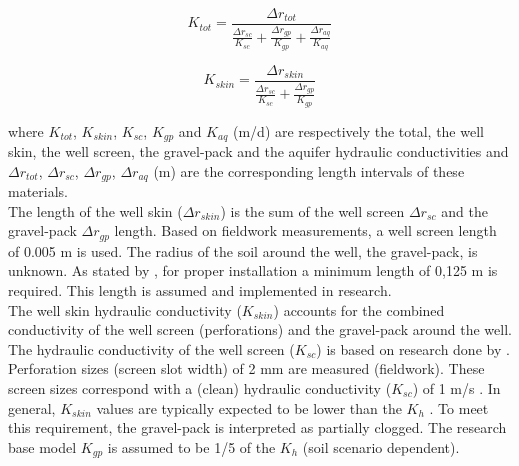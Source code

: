 \begin{equation}
 K_{tot} = \frac{\Delta r_{tot}}{\frac{\Delta r_{sc}}{K_{sc}} + \frac{\Delta r_{gp}}{K_{gp}} + \frac{\Delta r_{aq}}{K_{aq}}}
\label{eq:K_tot}
\end{equation}

\begin{equation}
 K_{skin} = \frac{\Delta r_{skin}}{\frac{\Delta r_{sc}}{K_{sc}} + \frac{\Delta r_{gp}}{K_{gp}}}
\label{eq:K_skin}
\end{equation}

where $K_{tot}$, $K_{skin}$, $K_{sc}$, $K_{gp}$ and $K_{aq}$ (m/d) are respectively the total, the well skin, the well screen, the gravel-pack and the aquifer hydraulic conductivities and ${\Delta r_{tot}}$, ${\Delta r_{sc}}$, ${\Delta r_{gp}}$, ${\Delta r_{aq}}$ (m) are the corresponding length intervals of these materials. \\

The length of the well skin ($\Delta r_{skin}$) is the sum of the well screen ${\Delta r_{sc}}$ and the gravel-pack ${\Delta r_{gp}}$ length. Based on fieldwork measurements, a well screen length of 0.005 m is used. The radius of the soil around the well, the gravel-pack, is unknown. As stated by \citep{Bot2016}, for proper installation a minimum length of 0,125 m is required. This length is assumed and implemented in research. \\

The well skin hydraulic conductivity ($K_{skin}$) accounts for the combined conductivity of the well screen (perforations) and the gravel-pack around the well. The hydraulic conductivity of the well screen ($K_{sc}$) is based on research done by \citet{Houben2015}. Perforation sizes (screen slot width) of 2 mm are measured (fieldwork). These screen sizes correspond with a (clean) hydraulic conductivity ($K_{sc}$) of 1 m/s \citep{Houben2015}. In general, $K_{skin}$ values are typically expected to be lower than the $K_{h}$ \citep{LeonardF.KonikowGeorgeZ.HornbergerKeithJ.Halford2009}. To meet this requirement, the gravel-pack is interpreted as partially clogged. The research base model $K_{gp}$ is assumed to be 1/5 of the $K_{h}$ (soil scenario dependent). \\



